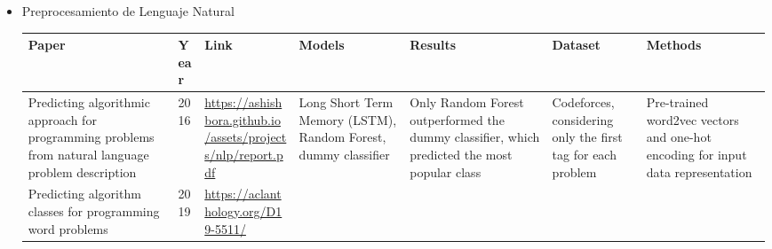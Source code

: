 \documentclass{article}
\begin{document}
\begin{itemize}
    \item Preprocesamiento de Lenguaje Natural
          
          \begin{longtable}{|p{2cm}|p{0.8cm}|p{2cm}|p{2cm}|p{3cm}|p{2cm}|p{3cm}|}
              \hline
              \textbf{Paper} & \textbf{Year}                                                                                                                                                       & \textbf{Link} & \textbf{Models} & \textbf{Results} & \textbf{Dataset} & \textbf{Methods} \\
              \hline
              \endfirsthead
              
              \hline
              \endfoot
              
              \hline
              \endlastfoot
              
              
              Predicting algorithmic approach for programming problems from natural language problem description 
                             & 2016 
                             & \href{https://ashishbora.github.io/assets/projects/nlp/report.pdf}{\url{https://ashishbora.github.io/assets/projects/nlp/report.pdf}}

              
              
              
              
              
              
                             & Long Short Term Memory (LSTM), Random Forest, dummy classifier 
                             & Only Random Forest outperformed the dummy classifier, which predicted the most popular class 
                             & Codeforces, considering only the first tag for each problem 
                             & Pre-trained word2vec vectors and one-hot encoding for input data representation                                                                                                                                                                                \\
              
              \hline
              Predicting algorithm classes for programming word problems
                             & 2019
                             & \href{https://aclanthology.org/D19-5511/}{\url{https://aclanthology.org/D19-5511/}}

              
              

\end{longtable}
\end{itemize}
\end{document}
